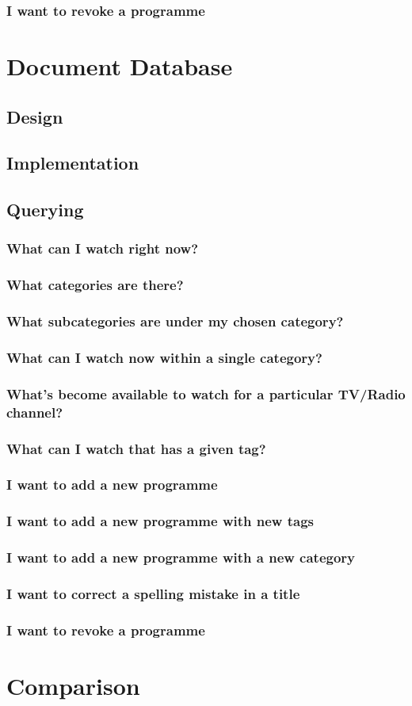\documentclass[11pt,a4paper]{article}
\begin{document}
\subsubsection{I want to revoke a programme}

\section{Document Database}
\subsection{Design}
\subsection{Implementation}
\subsection{Querying}
\subsubsection{What can I watch right now?}
\subsubsection{What categories are there?}
\subsubsection{What subcategories are under my chosen category?}
\subsubsection{What can I watch now within a single category?}
\subsubsection{What's become available to watch for a particular TV/Radio channel?}
\subsubsection{What can I watch that has a given tag?}
\subsubsection{I want to add a new programme}
\subsubsection{I want to add a new programme with new tags}
\subsubsection{I want to add a new programme with a new category}
\subsubsection{I want to correct a spelling mistake in a title}
\subsubsection{I want to revoke a programme}

\section{Comparison}



\end{document}

